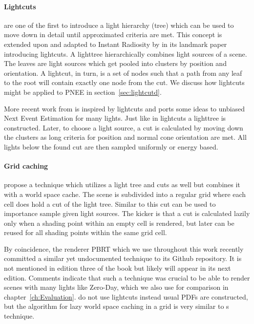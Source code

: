\paragraph{Lightcuts}

\textcite{DBLP:journals/cgf/PaquettePD98} are one of the first to introduce a light hierarchy (tree) which can be used to move down in detail until approximated criteria are met. This concept is extended upon and adapted to Instant Radiosity by \textcite{Walter2005LightcutsAS} in its landmark paper introducing lightcuts. A lighttree hierarchically combines light sources of a scene. The leaves are light sources which get pooled into clusters by position and orientation. A lightcut, in turn, is a set of nodes such that a path from any leaf to the root will contain exactly one node from the cut. We discuss how lightcuts might be applied to PNEE in section~\ref{sec:lightcutd}.

More recent work from \textcite{Estevez} is inspired by lightcuts and ports some ideas to unbiased Next Event Estimation for many lights. Just like in lightcuts a lighttree is constructed. Later, to choose a light source, a cut is calculated by moving down the clusters as long criteria for position and normal cone orientation are met. All lights below the found cut are then sampled uniformly or energy based.

\paragraph{Grid caching}

\textcite{Vevoda} propose a technique which utilizes a light tree and cuts as well but combines it with a world space cache. The scene is subdivided into a regular grid where each cell does hold a cut of the light tree. Similar to \citeauthor{Estevez} this cut can be used to importance sample given light sources. The kicker is that a cut is calculated lazily only when a shading point within an empty cell is rendered, but later can be reused for all shading points within the same grid cell.

By coincidence, the renderer PBRT \parencite{pbrt} which we use throughout this work recently committed a similar yet undocumented technique to its Github repository. It is not mentioned in edition three of the book but likely will appear in its next edition. Comments indicate that such a technique was crucial to be able to render scenes with many lights like Zero-Day, which we also use for comparison in chapter~\ref{ch:Evaluation}. \citeauthor{pbrt} do not use lightcuts instead usual PDFs are constructed, but the algorithm for lazy world space caching in a grid is very similar to \citeauthor{Vevoda}s technique.


